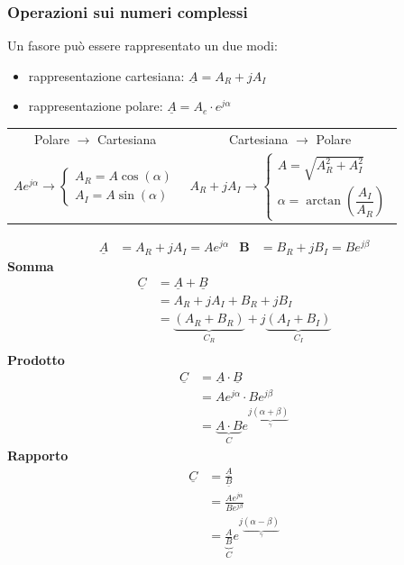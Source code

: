 \documentclass{article}
\begin{document}
\subsubsection{Operazioni sui numeri complessi}
Un fasore può essere rappresentato un due modi:
\begin{itemize}
    \item rappresentazione cartesiana: $\underline{A} = A_R + j A_I$
    \item rappresentazione polare: $\underline{A} = A_e \cdot e^{j \alpha}$
\end{itemize}
\begin{center}
   \begin{tabular}{c|c}
    Polare $\rightarrow$ Cartesiana & Cartesiana $\rightarrow$ Polare\\
    $ Ae^{j \alpha} \longrightarrow 
    \begin{cases}
        A_R = A \cos(\alpha)\\
        A_I = A \sin(\alpha)
    \end{cases} $
    &
    $A_R+jA_I \longrightarrow 
    \begin{cases}
        A = \sqrt{A_R^2+A_I^2}\\
        \alpha = \arctan \left(\dfrac{A_I}{A_R}\right)
    \end{cases}$
    \end{tabular} 
\end{center}
\begin{align*}
    \underline{A} &= A_R+j A_I = Ae^{j \alpha} & \textbf{B} &= B_R + j B_I = Be^{j\beta}
\end{align*}
\textbf{Somma}
\begin{align*}
    \underline{C} &= \underline{A} + \underline{B}\\
    &=A_R+jA_I + B_R + jB_I \\
    &= \underbrace{(A_R+B_R)}_{C_R} + j\underbrace{(A_I+B_I)}_{C_I}\\
\end{align*}
\textbf{Prodotto}
\begin{align*}
    \underline{C} &= \underline{A} \cdot \underline{B}\\
    &=A e^{j\alpha}\cdot Be^{j\beta}\\
    &=\underbrace{A \cdot B}_{C} e^{j\underbrace{(\alpha + \beta)}_{\gamma}}
\end{align*}
\textbf{Rapporto}
\begin{align*}
    \underline{C} &= \frac{\underline{A}}{\underline{B}} \\
    &= \frac{A e^{j \alpha}}{Be^{j \beta}}\\
    &=\underbrace{\frac{A}{B}}_{C} e^{j\underbrace{(\alpha - \beta)}_{\gamma}}
\end{align*}
\end{document}
